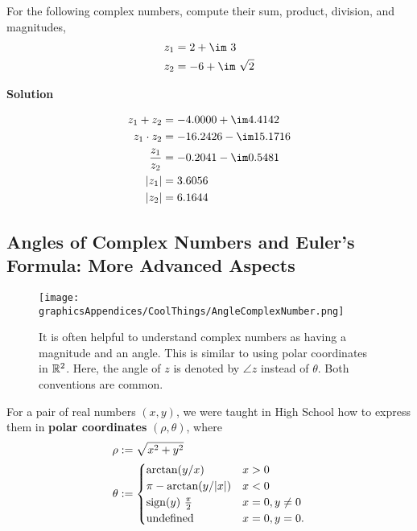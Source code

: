 \vspace*{0.2cm}
\begin{example}
\label{ex:OperationsOnComplexNumbers}
For the following complex numbers, compute their sum, product, division, and magnitudes,
$$\begin{aligned}
z_1 &= 2 + \im~3\\
z_2&= -6 + \im~ \sqrt{2} \\
\end{aligned}  $$
\end{example}

\textbf{Solution}

$$ 
\begin{aligned}
z_1 + z_2 &= -4.0000+ \im4.4142  \\
z_1 \cdot z_2 &= -16.2426-\im15.1716 \\
\frac{z_1}{z_2} &=  -0.2041-\im 0.5481  \\
|z_1|&= 3.6056 \\
|z_2|&= 6.1644
\end{aligned}
$$
\Qed


\subsection{Angles of Complex Numbers and Euler's Formula: More Advanced Aspects}


\begin{figure}[htb!]
\centering
\texttt{[image: graphicsAppendices/CoolThings/AngleComplexNumber.png]}
\caption[]{It is often helpful to understand complex numbers as having a magnitude and an angle. This is similar to using polar coordinates in $\mathbb R^2$. Here, the angle of $z$ is denoted by $\angle z$ instead of $\theta$. Both conventions are common.}
\label{fig:ComplexPlaneTake2}
\end{figure}


For a pair of real numbers $(x,y)$, we were taught in High School how to express them in \textbf{polar coordinates} $(\rho, \theta)$, where 
\begin{equation}
    \label{eq:AnglePolarCoordinates}
    \begin{aligned}
    \rho &:=\sqrt{x^2 + y^2} \medskip \\
    \theta &:= \begin{cases} \arctan(y/x)& x > 0\\ \pi - \arctan( y/|x|) & x < 0\\
    {\rm sign}(y) ~\frac{\pi}{2} & x = 0, y\neq 0 \\
    \text{undefined} & x=0, y=0.\end{cases}
    \end{aligned}
\end{equation}

